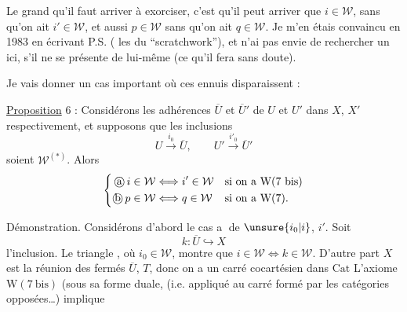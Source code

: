 
Le grand   qu'il faut arriver à exorciser,
c'est qu'il peut arriver que $i\in\mathcal W$, sans qu'on
ait $i'\in\mathcal W$, et aussi $p\in\mathcal W$ sans qu'on ait $q\in\mathcal W$.
Je m'en étais convaincu en 1983 en écrivant
P.S. ( les  du ``scratchwork''),
et n'ai pas envie de rechercher un 
ici, s'il ne se présente de lui-même (ce
qu'il fera sans doute).

Je vais donner un cas important où ces
ennuis disparaissent :

\uline{Proposition} 6 : Considérons les adhérences $\overline U$
et $\overline U'$ de $U$ et $U'$ dans $X$, $X'$ respectivement,
et supposons que  les inclusions
\[
 U\xrightarrow{i_0}\overline U,\qquad U'\xrightarrow{i'_0}\overline U'
\]
soient  $\mathcal W^{(*)}$. Alors
\[
\left\{\begin{aligned}
\text{\textcircled{a}}\, i\in\mathcal W&\Longleftrightarrow i'\in\mathcal W &&\text{si on a }\mathrm W(7\ \mathrm{bis})\\
\text{\textcircled{b}}\, p\in\mathcal W&\Longleftrightarrow q\in\mathcal W &&\text{si on a }\mathrm W(7).
\end{aligned}\right.
\]

Démonstration. Considérons d'abord le cas \textcircled{a} de
$\unsure{i_0|i}$, $i'$. Soit
\[
 k:\overline U\hookrightarrow X
\]
l'inclusion. Le triangle
, où $i_0\in\mathcal W$,
montre que $i\in\mathcal W\Longleftrightarrow k\in\mathcal W$. D'autre part $X$ est
la réunion des fermés $\overline U$, $T$, donc on a un
carré cocartésien dans $\mathrm{Cat}$
L'axiome $\mathrm W(7\ \mathrm{bis})$ (sous sa forme duale, (i.e. appliqué
au carré formé par les catégories opposées\ldots) implique

